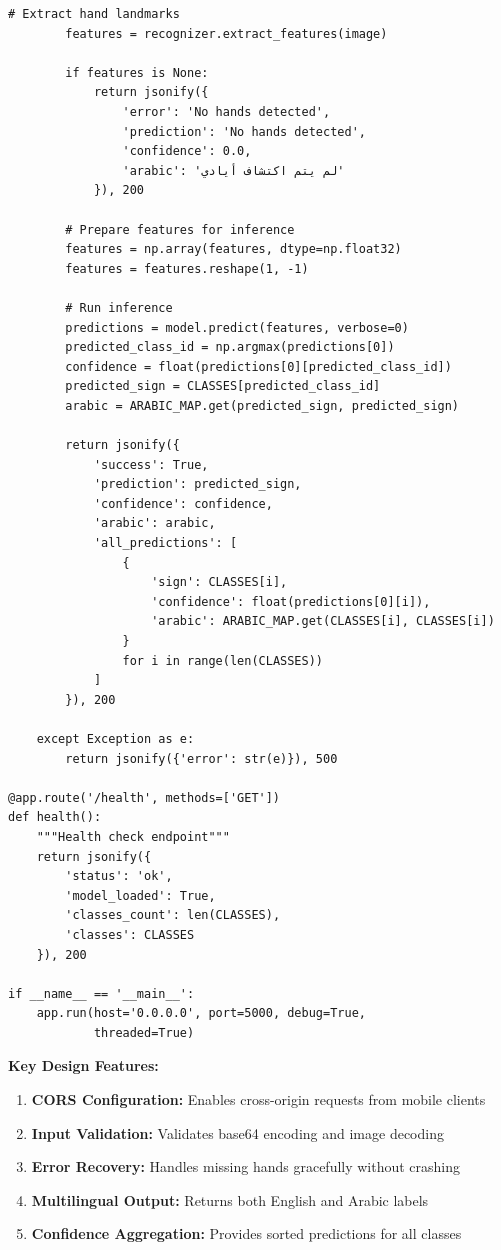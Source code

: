 \documentclass[11pt,a4paper,twoside]{report}
\begin{document}
\begin{lstlisting}[style=python, caption={Flask REST API for gesture recognition and translation}, label=lst:flask-api]
        # Extract hand landmarks
        features = recognizer.extract_features(image)
        
        if features is None:
            return jsonify({
                'error': 'No hands detected',
                'prediction': 'No hands detected',
                'confidence': 0.0,
                'arabic': 'لم يتم اكتشاف أيادي'
            }), 200

        # Prepare features for inference
        features = np.array(features, dtype=np.float32)
        features = features.reshape(1, -1)
        
        # Run inference
        predictions = model.predict(features, verbose=0)
        predicted_class_id = np.argmax(predictions[0])
        confidence = float(predictions[0][predicted_class_id])
        predicted_sign = CLASSES[predicted_class_id]
        arabic = ARABIC_MAP.get(predicted_sign, predicted_sign)

        return jsonify({
            'success': True,
            'prediction': predicted_sign,
            'confidence': confidence,
            'arabic': arabic,
            'all_predictions': [
                {
                    'sign': CLASSES[i],
                    'confidence': float(predictions[0][i]),
                    'arabic': ARABIC_MAP.get(CLASSES[i], CLASSES[i])
                }
                for i in range(len(CLASSES))
            ]
        }), 200

    except Exception as e:
        return jsonify({'error': str(e)}), 500

@app.route('/health', methods=['GET'])
def health():
    """Health check endpoint"""
    return jsonify({
        'status': 'ok',
        'model_loaded': True,
        'classes_count': len(CLASSES),
        'classes': CLASSES
    }), 200

if __name__ == '__main__':
    app.run(host='0.0.0.0', port=5000, debug=True, 
            threaded=True)
\end{lstlisting}

\textbf{Key Design Features:}

\begin{enumerate}
    \item \textbf{CORS Configuration:} Enables cross-origin requests from mobile clients
    \item \textbf{Input Validation:} Validates base64 encoding and image decoding
    \item \textbf{Error Recovery:} Handles missing hands gracefully without crashing
    \item \textbf{Multilingual Output:} Returns both English and Arabic labels
    \item \textbf{Confidence Aggregation:} Provides sorted predictions for all classes
\end{enumerate}
\end{document}
